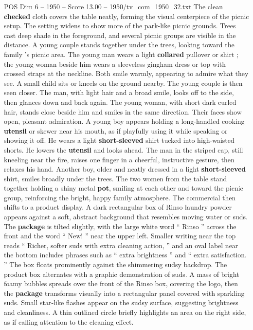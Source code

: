 \begin{textsample}{POS Dim 6 – 1950 – Score 13.00 – 1950/tv\_com\_1950\_32.txt}
The clean \textbf{checked} cloth covers the table neatly, forming the visual centerpiece of the picnic setup.
The setting widens to show more of the park-like picnic grounds.
Trees cast deep shade in the foreground, and several picnic groups are visible in the distance.
A young couple stands together under the trees, looking toward the family ’s picnic area.
The young man wears a light \textbf{collared} pullover or shirt ; the young woman beside him wears a sleeveless gingham dress or top with crossed straps at the neckline.
Both smile warmly, appearing to admire what they see.
A small child sits or kneels on the ground nearby.
The young couple is then seen closer.
The man, with light hair and a broad smile, looks off to the side, then glances down and back again.
The young woman, with short dark curled hair, stands close beside him and smiles in the same direction.
Their faces show open, pleasant admiration.
A young boy appears holding a long-handled cooking \textbf{utensil} or skewer near his mouth, as if playfully using it while speaking or showing it off.
He wears a light \textbf{short-sleeved} shirt tucked into high-waisted shorts.
He lowers the \textbf{utensil} and looks ahead.
The man in the striped cap, still kneeling near the fire, raises one finger in a cheerful, instructive gesture, then relaxes his hand.
Another boy, older and neatly dressed in a light \textbf{short-sleeved} shirt, smiles broadly under the trees.
The two women from the table stand together holding a shiny metal \textbf{pot}, smiling at each other and toward the picnic group, reinforcing the bright, happy family atmosphere.
The commercial then shifts to a product display.
A dark rectangular box of Rinso laundry powder appears against a soft, abstract background that resembles moving water or suds.
The \textbf{package} is tilted slightly, with the large white word “ Rinso ” across the front and the word “ New! ” near the upper left.
Smaller writing near the top reads “ Richer, softer suds with extra cleaning action, ” and an oval label near the bottom includes phrases such as “ extra brightness ” and “ extra satisfaction. ” The box floats prominently against the shimmering sudsy backdrop.
The product box alternates with a graphic demonstration of suds.
A mass of bright foamy bubbles spreads over the front of the Rinso box, covering the logo, then the \textbf{package} transforms visually into a rectangular panel covered with sparkling suds.
Small star-like flashes appear on the sudsy surface, suggesting brightness and cleanliness.
A thin outlined circle briefly highlights an area on the right side, as if calling attention to the cleaning effect.

\end{textsample}
